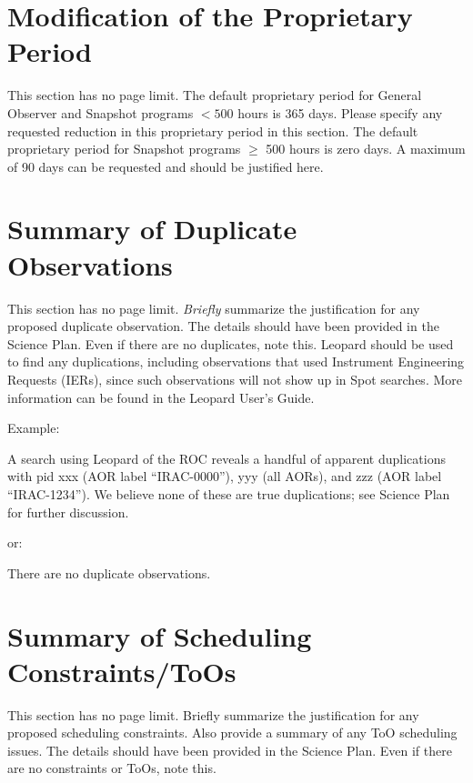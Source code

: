 \documentclass[letterpaper,12pt]{article}
\begin{document}
\section{Modification of the Proprietary Period}

This section has no page limit. The default proprietary period for General 
Observer and Snapshot programs $< 500$ hours is 365 days. 
Please specify any requested reduction in this proprietary period in this section.
The default proprietary period for Snapshot programs $\ge$ 500 hours is zero days.
A maximum of 90 days can be requested and should be justified here.

\section{Summary of Duplicate Observations}

This section has no page limit. {\it Briefly} summarize the justification for 
any proposed duplicate observation. The details should have been provided in the
Science Plan.  Even if there are no duplicates, note this. Leopard should be 
used to find any duplications, including observations that used Instrument
Engineering Requests (IERs), since such observations will not
show up in Spot searches. More information can be found in the
Leopard User's Guide.\newline

\noindent Example: 

A search using Leopard of the ROC reveals a handful of apparent
duplications with pid xxx (AOR label ``IRAC-0000''), yyy (all
AORs), and zzz (AOR label ``IRAC-1234'').  We believe none of
these are true duplications; see Science Plan for further discussion.  \newline

\noindent or: \newline

\noindent There are no duplicate observations.


\section{Summary of Scheduling Constraints/ToOs}

This section has no page limit. Briefly summarize the justification for 
any proposed scheduling constraints. 
Also provide a summary of any ToO scheduling issues. 
The details should have been provided in the Science Plan. Even if there 
are no constraints or ToOs, note this.\newline
\end{document}
